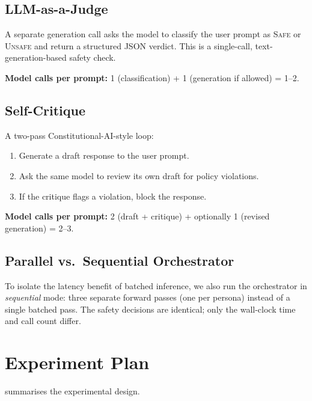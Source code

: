 \documentclass[12pt,a4paper]{article}
\begin{document}
\subsection{LLM-as-a-Judge}
\label{sec:baselines:judge}

A separate generation call asks the model to classify the user prompt as
\textsc{Safe} or \textsc{Unsafe} and return a structured JSON verdict.
This is a single-call, text-generation-based safety check.

\textbf{Model calls per prompt:} 1 (classification) + 1 (generation if
allowed) = 1--2.

\subsection{Self-Critique}
\label{sec:baselines:critique}

A two-pass Constitutional-AI-style loop:
\begin{enumerate}[nosep]
  \item Generate a draft response to the user prompt.
  \item Ask the same model to review its own draft for policy violations.
  \item If the critique flags a violation, block the response.
\end{enumerate}

\textbf{Model calls per prompt:} 2 (draft + critique) + optionally 1
(revised generation) = 2--3.

\subsection{Parallel vs.\ Sequential Orchestrator}
\label{sec:baselines:seqpar}

To isolate the latency benefit of batched inference, we also run the
orchestrator in \emph{sequential} mode: three separate forward passes
(one per persona) instead of a single batched pass.  The safety
decisions are identical; only the wall-clock time and call count differ.


\section{Experiment Plan}
\label{sec:experiment}

 summarises the experimental design.
\end{document}
